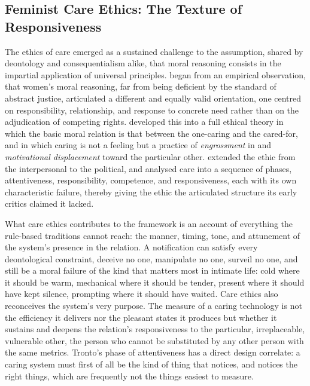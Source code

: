 \subsection{Feminist Care Ethics: The Texture of Responsiveness}\label{p01:sec:care}

The ethics of care emerged as a sustained challenge to the assumption, shared by deontology and consequentialism alike, that moral reasoning consists in the impartial application of universal principles. \textcite{gilligan1982voice} began from an empirical observation, that women's moral reasoning, far from being deficient by the standard of abstract justice, articulated a different and equally valid orientation, one centred on responsibility, relationship, and response to concrete need rather than on the adjudication of competing rights. \textcite{noddings1984caring} developed this into a full ethical theory in which the basic moral relation is that between the one-caring and the cared-for, and in which caring is not a feeling but a practice of \emph{engrossment} in and \emph{motivational displacement} toward the particular other. \textcite{held2006ethics} extended the ethic from the interpersonal to the political, and \textcite{tronto1993moral} analysed care into a sequence of phases, attentiveness, responsibility, competence, and responsiveness, each with its own characteristic failure, thereby giving the ethic the articulated structure its early critics claimed it lacked.

What care ethics contributes to the framework is an account of everything the rule-based traditions cannot reach: the manner, timing, tone, and attunement of the system's presence in the relation. A notification can satisfy every deontological constraint, deceive no one, manipulate no one, surveil no one, and still be a moral failure of the kind that matters most in intimate life: cold where it should be warm, mechanical where it should be tender, present where it should have kept silence, prompting where it should have waited. Care ethics also reconceives the system's very purpose. The measure of a caring technology is not the efficiency it delivers nor the pleasant states it produces but whether it sustains and deepens the relation's responsiveness to the particular, irreplaceable, vulnerable other, the person who cannot be substituted by any other person with the same metrics. Tronto's phase of attentiveness has a direct design correlate: a caring system must first of all be the kind of thing that notices, and notices the right things, which are frequently not the things easiest to measure.

